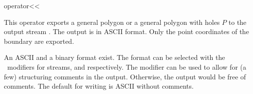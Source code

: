
\ccHtmlNoClassLinks
\begin{ccRefFunction}{operator<<}
\label{refPolygon_with_holes_operator_leftshift}

\ccDefinition

This operator exports a general polygon or a general polygon with
holes $P$ to the output stream . The output is in ASCII
format. Only the point coordinates of the boundary are exported.

An ASCII and a binary format exist. The format can be selected with
the \cgal\ modifiers for streams,  and
 respectively. The modifier 
can be used to allow for (a few) structuring comments in the
output. Otherwise, the output would be free of comments.  The default
for writing is ASCII without comments.


  

  
\ccSeeAlso

\\ 
\\ 
\\ 

\end{ccRefFunction}
